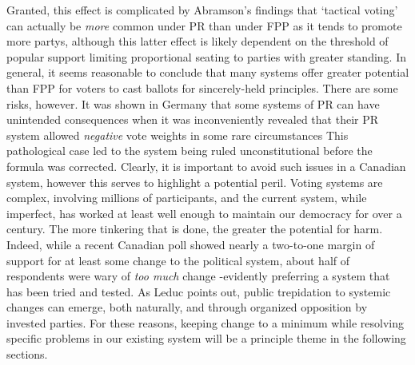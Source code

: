 Granted, this effect is complicated by Abramson's findings that `tactical voting' can actually be \emph{more} common under PR than under FPP as it tends to promote more partys\cite{Abramson_2010}, although this latter effect is likely dependent on the threshold of popular support limiting proportional seating to parties with greater standing.
In general, it seems reasonable to conclude that many systems offer greater potential than FPP for voters to cast ballots for sincerely-held principles.
There are some risks, however. It was shown in Germany that some systems of PR can have unintended consequences when it was inconveniently revealed that their PR system allowed \emph{negative} vote weights in some rare circumstances\cite{Die_Zeit_negative_vote}
This pathological case led to the system being ruled unconstitutional before the formula was corrected.
Clearly, it is important to avoid such issues in a Canadian system, however this serves to highlight a potential peril.
Voting systems are complex, involving millions of participants, and the current system, while imperfect, has worked at least well enough to maintain our democracy for over a century.
The more tinkering that is done, the greater the potential for harm.
Indeed, while a recent Canadian poll\cite{Broadbent_poll} showed nearly a two-to-one margin of support for at least some change to the political system, about half of respondents were wary of \emph{too much} change \--evidently preferring a system that has been tried and tested.
As Leduc points out\cite{Leduc}, public trepidation to systemic changes can emerge, both naturally, and through organized opposition by invested parties.
For these reasons, keeping change to a minimum while resolving specific problems in our existing system will be a principle theme in the following sections.


